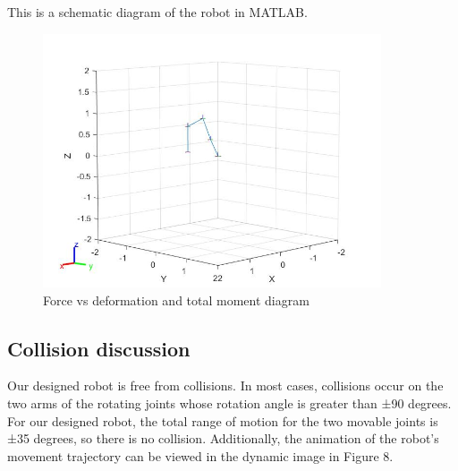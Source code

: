 This is a schematic diagram of the robot in MATLAB.

\begin{figure}[htbp]
    \centering
    \includegraphics[width=10cm]{./fig/1.jpg}
    \caption{Force vs deformation and total moment diagram}
    \label{f4}
\end{figure}

\subsection{Collision discussion}

Our designed robot is free from collisions. In most cases, collisions occur on the two arms of the rotating joints whose rotation angle is greater than ±90 degrees. For our designed robot, the total range of motion for the two movable joints is ±35 degrees, so there is no collision. Additionally, the animation of the robot's movement trajectory can be viewed in the dynamic image in Figure 8.
